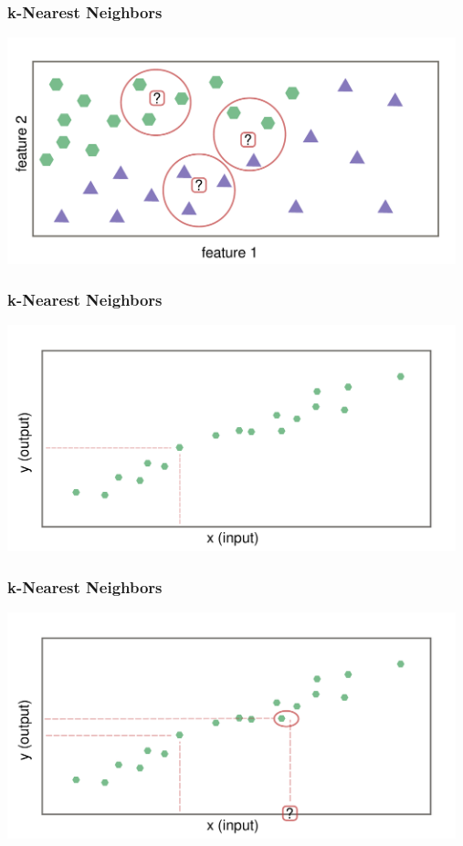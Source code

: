 \documentclass[aspectratio=169]{beamer}
\begin{document}
\begin{frame}
  \frametitle{k-Nearest Neighbors}
  \begin{center}
    \includegraphics[width=13.0cm]{images/k_nearest_neighbour_classification_k_3.pdf}
  \end{center}
\end{frame}

\begin{frame}
  \frametitle{k-Nearest Neighbors}
  \begin{center}
    \includegraphics[width=13.0cm]{images/k_nearest_neighbour_regression_only_training_data.pdf}
  \end{center}
\end{frame}

\begin{frame}
  \frametitle{k-Nearest Neighbors}
  \begin{center}
    \includegraphics[width=13.0cm]{images/k_nearest_neighbour_regression_k_1.pdf}    
  \end{center}
\end{frame}
\end{document}
